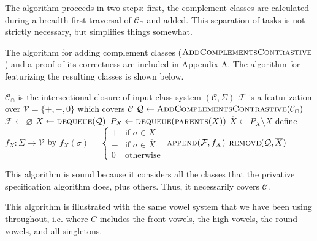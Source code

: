 \documentclass[11pt, oneside]{article}   	%
\begin{document}
The algorithm proceeds in two steps: first, the complement classes are calculated during a breadth-first traversal of $\mathcal{C_\cap}$ and added. This separation of tasks is not strictly necessary, but simplifies things somewhat.

The algorithm for adding complement classes ($\textsc{AddComplementsContrastive}$) and a proof of its correctness are included in Appendix A. The algorithm for featurizing the resulting classes is shown below.

\vspace{\baselineskip} \noindent \begin{algorithmic}
    \REQUIRE $\mathcal C_\cap$ is the intersectional closure of input class system $(\mathcal C, \Sigma)$
    \ENSURE $\mathcal F$ is a featurization over $\mathcal V = \{ +, -, 0 \}$ which covers $\mathcal C$
    \STATE
    \STATE $\mathcal Q \leftarrow \textsc{AddComplementsContrastive}(\mathcal{C_\cap})$
    \STATE $\mathcal F \leftarrow \varnothing$
    \STATE
        \STATE $X \leftarrow \textsc{dequeue}(\mathcal Q)$
            \STATE $P_X \leftarrow \textsc{dequeue}(\textsc{parents}(X))$
            \STATE $\overline{X} \leftarrow P_X \setminus X$
            \STATE define $f_X : \Sigma \rightarrow \mathcal V$ by $f_X (\sigma) = \begin{cases}
                    + & \text{if } \sigma \in X \\
                    - & \text{if } \sigma \in \overline{X} \\
                    0 & \text{otherwise}
                    \end{cases}$
            \STATE $\textsc{append}(\mathcal F, f_X)$
            \STATE $\textsc{remove}(\mathcal{Q}, \overline{X})$
        \ENDIF
    \ENDWHILE
\end{algorithmic}

\vspace{\baselineskip} \noindent This algorithm is sound because it considers all the classes that the privative specification algorithm does, plus others. Thus, it necessarily covers $\mathcal C$.

\vspace{\baselineskip} This algorithm is illustrated with the same vowel system that we have been using throughout, i.e. where $C$ includes the front vowels, the high vowels, the round vowels, and all singletons.
\end{document}
